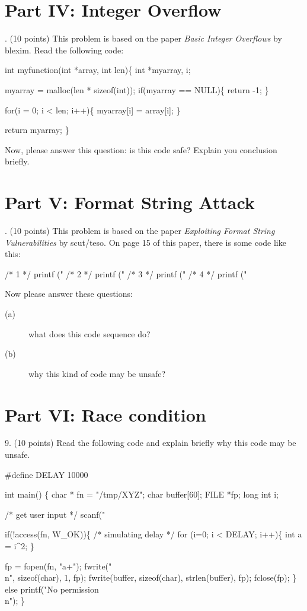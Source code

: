 \documentclass[a4paper, 10pt]{article}
\begin{document}
\iffalse

\section*{Part IV: Integer Overflow}
. (10 points) This problem is based on the paper
\textit{Basic Integer Overflows} by blexim. Read the following
code:
\begin{code}
int myfunction(int *array, int len)\{
        int *myarray, i;

        myarray = malloc(len * sizeof(int));
        if(myarray == NULL)\{
            return -1;
        \}

        for(i = 0; i < len; i++)\{
            myarray[i] = array[i];
        \}

        return myarray;
\}
\end{code}
Now, please answer this question: is this code safe? Explain
you conclusion briefly.

\newpage

\section*{Part V: Format String Attack}
. (10 points) This problem is based on the paper
\textit{Exploiting Format String Vulnerabilities} by
scut/teso. On page 15 of this paper, there is some
code like this:
\begin{code}
/* 1 */ printf ("%
/* 2 */ printf ("%
/* 3 */ printf ("%
/* 4 */ printf ("%
\end{code}
Now please answer these questions:
\begin{description}
  \item[(a)] what does this code sequence do?
  \item[(b)] why this kind of code may be unsafe?
\end{description}

\newpage

\section*{Part VI: Race condition}
9. (10 points) Read the following code and
explain briefly why this code may be unsafe.
\begin{code}
\#define DELAY 10000

int main()
\{
    char * fn = "/tmp/XYZ";
    char buffer[60];
    FILE *fp;
    long int  i;

    /* get user input */
    scanf("%

    if(!access(fn, W\_OK))\{
      /* simulating delay */
      for (i=0; i < DELAY; i++)\{
        int a = i^2;
      \}

      fp = fopen(fn, "a+");
      fwrite("\\n", sizeof(char), 1, fp);
      fwrite(buffer, sizeof(char), strlen(buffer), fp);
      fclose(fp);
    \}
    else printf("No permission \\n");
\}
\end{code}
\end{document}
